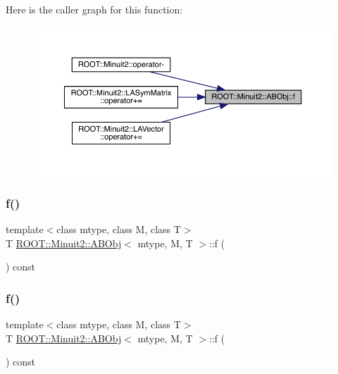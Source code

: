 Here is the caller graph for this function\+:
\nopagebreak
\begin{figure}[H]
\begin{center}
\leavevmode
\includegraphics[width=350pt]{d8/d4e/classROOT_1_1Minuit2_1_1ABObj_aa640f928a8ec245b70d4ac294e1418e5_icgraph}
\end{center}
\end{figure}
\mbox{\label{classROOT_1_1Minuit2_1_1ABObj_aa640f928a8ec245b70d4ac294e1418e5}} 
\subsubsection{\texorpdfstring{f()}{f()}\hspace{0.1cm}{\footnotesize\ttfamily [2/3]}}
{\footnotesize\ttfamily template$<$class mtype, class M, class T$>$ \\
T \mbox{\hyperlink{classROOT_1_1Minuit2_1_1ABObj}{R\+O\+O\+T\+::\+Minuit2\+::\+A\+B\+Obj}}$<$ mtype, M, T $>$\+::f (\begin{DoxyParamCaption}{ }\end{DoxyParamCaption}) const\hspace{0.3cm}{\ttfamily [inline]}}

\mbox{\label{classROOT_1_1Minuit2_1_1ABObj_aa640f928a8ec245b70d4ac294e1418e5}} 
\subsubsection{\texorpdfstring{f()}{f()}\hspace{0.1cm}{\footnotesize\ttfamily [3/3]}}
{\footnotesize\ttfamily template$<$class mtype, class M, class T$>$ \\
T \mbox{\hyperlink{classROOT_1_1Minuit2_1_1ABObj}{R\+O\+O\+T\+::\+Minuit2\+::\+A\+B\+Obj}}$<$ mtype, M, T $>$\+::f (\begin{DoxyParamCaption}{ }\end{DoxyParamCaption}) const\hspace{0.3cm}{\ttfamily [inline]}}

